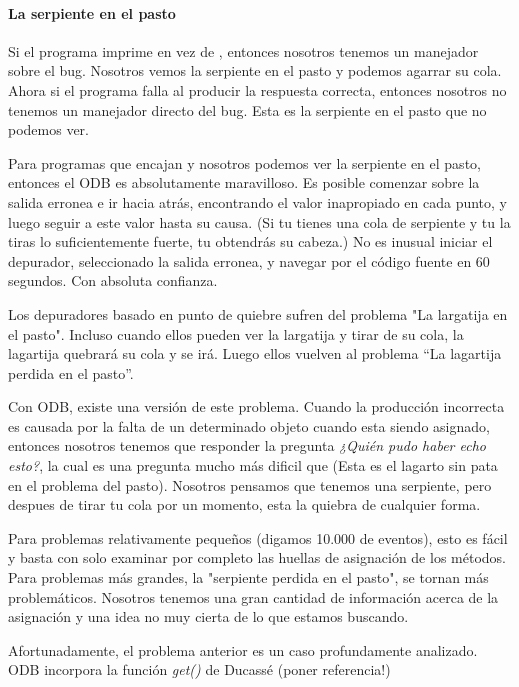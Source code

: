 \documentclass[12pt,a4paper]{report}
\begin{document}
				\paragraph{La serpiente en el pasto}

Si el programa imprime  en vez de , entonces nosotros tenemos un manejador sobre el bug.  Nosotros vemos la serpiente en el pasto y podemos agarrar su cola.  Ahora si el programa falla al producir la respuesta correcta, entonces nosotros no tenemos un manejador directo del bug.  Esta es la serpiente en el pasto que no podemos ver.

Para programas que encajan y nosotros podemos ver la serpiente en el pasto, entonces el ODB es absolutamente maravilloso.  Es posible comenzar sobre la salida erronea e ir hacia atrás, encontrando el valor inapropiado en cada punto, y luego seguir a este valor hasta su causa. (Si tu tienes una cola de serpiente y tu la tiras lo suficientemente fuerte, tu obtendrás su cabeza.)  No es inusual iniciar el depurador, seleccionado la salida erronea, y navegar por el código fuente en 60 segundos. Con absoluta confianza.

Los depuradores basado en punto de quiebre sufren del problema "La largatija en el pasto".  Incluso cuando ellos pueden ver la largatija y tirar de su cola, la lagartija quebrará su cola y se irá.  Luego ellos vuelven al problema “La lagartija perdida en el pasto”.

Con ODB, existe una versión de este problema.  Cuando la producción incorrecta es causada por la falta de un determinado objeto cuando esta siendo asignado, entonces nosotros tenemos que responder la pregunta \textit{¿Quién pudo haber echo esto?}, la cual es una pregunta mucho más dificil que  (Esta es el lagarto sin pata en el problema del pasto).  Nosotros pensamos que tenemos una serpiente, pero despues de tirar tu cola por un momento, esta la quiebra de cualquier forma.

Para problemas relativamente pequeños (digamos 10.000 de eventos), esto es fácil y basta con solo examinar por completo las huellas de asignación de los métodos.  Para problemas más grandes, la "serpiente perdida en el pasto", se tornan más problemáticos.  Nosotros tenemos una gran cantidad de información acerca de la asignación y una idea no muy cierta de lo que estamos buscando.

Afortunadamente, el problema anterior es un caso profundamente analizado.  ODB incorpora la función \textit{get()} de Ducassé (poner referencia!)
\end{document}

